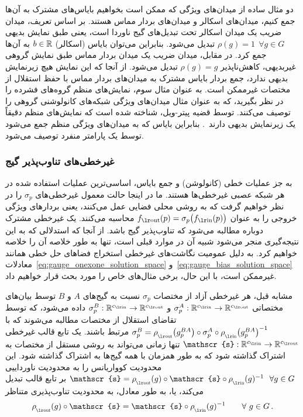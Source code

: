 دو مثال ساده از میدان‌های ویژگی که ممکن است بخواهیم بایاس‌های مشترک به آن‌ها جمع کنیم، میدان‌های اسکالر و میدان‌های بردار مماس هستند.
بر اساس تعریف، میدان ضریب یک میدان اسکالر تحت تبدیل‌های گیج ناوردا است، یعنی طبق نمایش بدیهی ${\rho(g)=1\ \ \forall g\in G}$ تبدیل می‌شود.
بنابراین می‌توان بایاس (اسکالر) $b \in \mathbb{R}$ به آن‌ها جمع کرد.
در مقابل، میدان ضریب یک میدان بردار مماس طبق نمایش گروهی غیربدیهی، کاهش‌ناپذیر $\rho(g)=g$ تبدیل می‌شود.
از آنجا که این نمایش هیچ زیرنمایش بدیهی ندارد، جمع بردار بایاس مشترک به میدان‌های بردار مماس با حفظ استقلال از مختصات غیرممکن است.
به عنوان مثال سوم، نمایش‌های منظم گروه‌های فشرده را در نظر بگیرید، که به عنوان مثال میدان‌های ویژگی شبکه‌های کانولوشنی گروهی را توصیف می‌کنند.
توسط قضیه پیتر-ویل، شناخته شده است که نمایش‌های منظم دقیقاً یک زیرنمایش بدیهی دارند~\cite{gurarie1992symmetries,gallier2019harmonicRepr}.
بنابراین بایاس که به میدان‌های ویژگی منظم جمع می‌شود توسط یک پارامتر منفرد توصیف می‌شود.


\subsubsection{غیرخطی‌های تناوب‌پذیر گیج}
\label{sec:gauge_nonlinearities}


به جز عملیات خطی (کانولوشن) و جمع بایاس، اساسی‌ترین عملیات استفاده شده در هر شبکه عصبی غیرخطی‌ها هستند.
ما در اینجا حالت معمول غیرخطی‌های $\sigma_p$ را در نظر خواهیم گرفت که به روشی محلی فضایی عمل می‌کنند، یعنی بردارهای ویژگی خروجی را به عنوان $\fout(p) = \sigma_p\big( \fin(p) \big)$ محاسبه می‌کنند.
یک غیرخطی مشترک دوباره مطالبه می‌شود که تناوب‌پذیر گیج باشد.
از آنجا که استدلالی که به این نتیجه‌گیری منجر می‌شود شبیه آن در موارد قبلی است، تنها به طور خلاصه آن را خلاصه خواهیم کرد.
به دلیل عمومیت نگاشت‌های غیرخطی استخراج فضاهای حل خطی همانند معادلات~\eqref{eq:gauge_onexone_solution_space} و~\eqref{eq:gauge_bias_solution_space} غیرممکن است، با این حال، برخی مثال‌های خاص را مورد بحث قرار خواهیم داد.


مشابه قبل، هر غیرخطی آزاد از مختصات $\sigma_p$ نسبت به گیج‌های $A$ و $B$ توسط بیان‌های مختصاتی $\sigma_p^A: \R^{\cin} \to \R^{\cout}$ و $\sigma_p^B: \R^{\cin} \to \R^{\cout}$ داده می‌شود، که توسط تقاضای استقلال از مختصات مطالبه می‌شوند که با $\sigma_p^B = \rhoout\big( g_p^{BA}\big) \circ \sigma_p^A \circ \rhoin\big( g_p^{BA}\big)^{-1}$ مرتبط باشند.
یک تابع قالب غیرخطی $\mathscr{s}: \R^{\cin} \to \R^{\cout}$ تنها زمانی می‌تواند به روشی مستقل از مختصات به اشتراک گذاشته شود که به طور همزمان با همه گیج‌ها به اشتراک گذاشته شود.
این محدودیت کوواریانس را به محدودیت ناورداییی $\mathscr{s} = \rhoout(g) \circ \mathscr{s} \circ \rhoin(g)^{-1}\ \ \forall g\in G$ بر تابع قالب تبدیل می‌کند، یا، به طور معادل، به محدودیت تناوب‌پذیری متناظر
\begin{align}\label{eq:gauge_constraint_nonlinearities}
	\rhoout(g) \circ \mathscr{s} = \mathscr{s} \circ \rhoin(g)^{-1} \qquad \forall\ g\in G \,.
\end{align}


